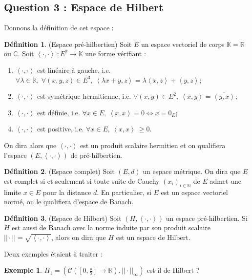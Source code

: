 \documentclass[a4paper,11pt]{article}
\theoremstyle{plain}
\theoremstyle{definition}
\newtheorem*{defi}{Définition}
\newtheorem*{expl}{Exemple}
\begin{document}
\subsection*{Question 3 : Espace de Hilbert}
Donnons la définition de cet espace :
\begin{defi} (Espace pré-hilbertien)
Soit $E$ un espace vectoriel de corps $\mathbb{K} = \mathbb{R}$ ou $\mathbb{C}$.
Soit $\left<\cdot,\cdot\right> \ : E^2 \to \mathbb{K}$ une forme vérifiant :
\begin{enumerate}
	\item $\left<\cdot,\cdot\right>$ est linéaire à gauche, i.e. $\forall \lambda \in \mathbb{K}, \ \forall (x,y,z) \in E^3, \ \left<\lambda x + y,z\right> = \lambda\left<x,z\right> + \left<y,z\right>$;
	\item $\left<\cdot,\cdot\right>$ est symétrique hermitienne, i.e. $\forall (x,y) \in E^2, \ \left<x,y\right> = \overline{\left<y,x\right>}$;
	\item $\left<\cdot,\cdot\right>$ est définie, i.e. $\forall x \in E, \ \left<x,x\right> = 0 \Leftrightarrow x = 0_{E}$;
	\item $\left<\cdot,\cdot\right>$ est positive, i.e. $\forall x \in E, \ \left<x,x\right> \ \geq 0$.
\end{enumerate}
On dira alors que $\left<\cdot,\cdot\right>$ est un produit scalaire hermitien et on qualifiera l'espace $(E, \left<\cdot,\cdot\right>)$ de pré-hilbertien.
\end{defi}

\begin{defi} (Espace complet)
Soit $(E,d)$ un espace métrique.
On dira que $E$ est complet si et seulement si toute suite de Cauchy $(x_{i})_{i \in \mathbb{N}}$ de $E$ admet une limite $x \in E$ pour la distance $d$.
En particulier, si $E$ est un espace vectoriel normé, on le qualifiera d'espace de Banach.
\end{defi}

\begin{defi} (Espace de Hilbert)
Soit $(H, \left<\cdot,\cdot\right>)$ un espace pré-hilbertien.
Si $H$ est aussi de Banach avec la norme induite par son produit scalaire $||\cdot|| = \sqrt{\left<\cdot,\cdot\right>}$, alors on dira que $H$ est un espace de Hilbert.
\end{defi}

Deux exemples étaient à traiter :
\begin{expl}
$H_{1} = \left(\mathcal{C}\left([0,\frac{\pi}{2}] \to \mathbb{R}\right), ||\cdot||_{\infty}\right)$ est-il de Hilbert ?
\end{expl}
\end{document}
